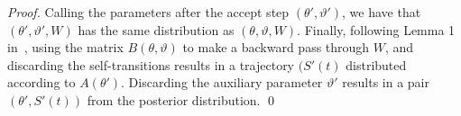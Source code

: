 \begin{proof}
Calling the parameters 
after the accept step $(\theta', \vartheta')$, we have that
$(\theta', \vartheta',W)$ has the same distribution as
$(\theta, \vartheta,W)$.
Finally, following Lemma 1 in~\cite{RaoTeh13}, using the matrix 
$B(\theta,\vartheta)$ to make a backward pass through $W$,
and discarding the self-transitions results in a trajectory $(S'(t)$
distributed according to $A(\theta')$. Discarding the auxiliary parameter
$\vartheta'$ results in a pair $(\theta',S'(t))$ from
the posterior distribution.
\qed
\end{proof}

